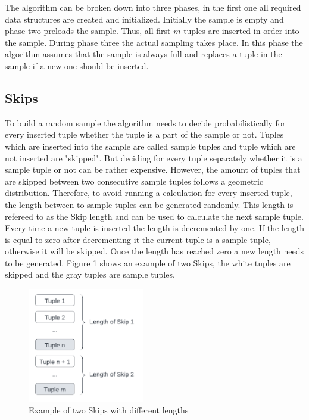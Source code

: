 \documentclass[sigconf,nonacm]{acmart}
\begin{document}
        The algorithm can be broken down into three phases, in the first one all required data structures are created and initialized. Initially the sample is empty and phase two preloads the sample. Thus, all first $m$ tuples are inserted in order into the sample. During phase three the actual sampling takes place. In this phase the algorithm assumes that the sample is always full and replaces a tuple in the sample if a new one should be inserted.
        
    \subsection{Skips}
        To build a random sample the algorithm needs to decide probabilistically for every inserted tuple whether the tuple is a part of the sample or not. Tuples which are inserted into the sample are called sample tuples and tuple which are not inserted are "skipped". But deciding for every tuple separately whether it is a sample tuple or not can be rather expensive. However, the amount of tuples that are skipped between two consecutive sample tuples follows a geometric distribution. Therefore, to avoid running a calculation for every inserted tuple, the length between to sample tuples can be generated randomly. This length is refereed to as the Skip length and can be used to calculate the next sample tuple. Every time a new tuple is inserted the length is decremented by one. If the length is equal to zero after decrementing it the current tuple is a sample tuple, otherwise it will be skipped. Once the length has reached zero a new length needs to be generated. Figure \ref{fig:skips} shows an example of two Skips, 
        the white tuples are skipped and the gray tuples are sample tuples.
        \begin{figure}[h]
            \centering
            \includegraphics[height=5cm]{figure1.pdf}
            \caption{Example of two Skips with different lengths}
            \label{fig:skips}
        \end{figure}
\end{document}
